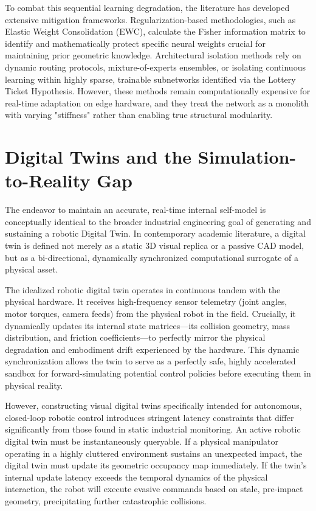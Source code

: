 ﻿\documentclass[12pt,a4paper,oneside]{report}
\begin{document}
To combat this sequential learning degradation, the literature has developed extensive mitigation frameworks. Regularization-based methodologies, such as Elastic Weight Consolidation (EWC), calculate the Fisher information matrix to identify and mathematically protect specific neural weights crucial for maintaining prior geometric knowledge. Architectural isolation methods rely on dynamic routing protocols, mixture-of-experts ensembles, or isolating continuous learning within highly sparse, trainable subnetworks identified via the Lottery Ticket Hypothesis. However, these methods remain computationally expensive for real-time adaptation on edge hardware, and they treat the network as a monolith with varying "stiffness" rather than enabling true structural modularity.

\section{Digital Twins and the Simulation-to-Reality Gap}

The endeavor to maintain an accurate, real-time internal self-model is conceptually identical to the broader industrial engineering goal of generating and sustaining a robotic Digital Twin. In contemporary academic literature, a digital twin is defined not merely as a static 3D visual replica or a passive CAD model, but as a bi-directional, dynamically synchronized computational surrogate of a physical asset.

The idealized robotic digital twin operates in continuous tandem with the physical hardware. It receives high-frequency sensor telemetry (joint angles, motor torques, camera feeds) from the physical robot in the field. Crucially, it dynamically updates its internal state matrices---its collision geometry, mass distribution, and friction coefficients---to perfectly mirror the physical degradation and embodiment drift experienced by the hardware. This dynamic synchronization allows the twin to serve as a perfectly safe, highly accelerated sandbox for forward-simulating potential control policies before executing them in physical reality.

However, constructing visual digital twins specifically intended for autonomous, closed-loop robotic control introduces stringent latency constraints that differ significantly from those found in static industrial monitoring. An active robotic digital twin must be instantaneously queryable. If a physical manipulator operating in a highly cluttered environment sustains an unexpected impact, the digital twin must update its geometric occupancy map immediately. If the twin's internal update latency exceeds the temporal dynamics of the physical interaction, the robot will execute evasive commands based on stale, pre-impact geometry, precipitating further catastrophic collisions.
\end{document}
